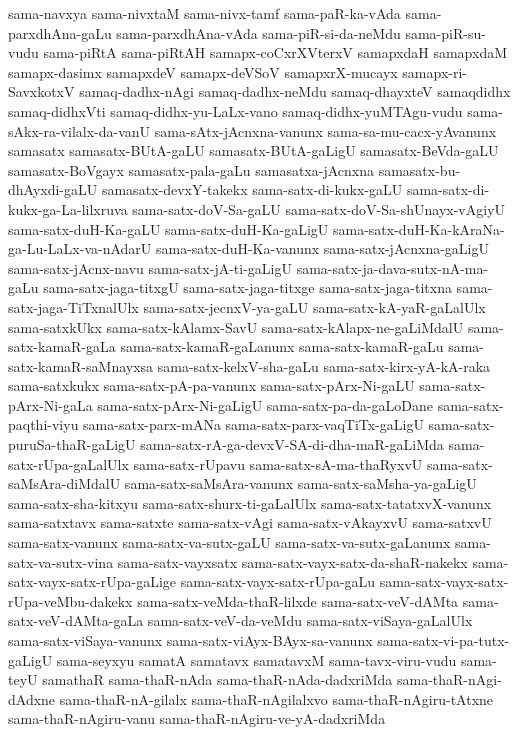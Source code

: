 {sama-navxya
sama-nivxtaM
sama-nivx-tamf
sama-paR-ka-vAda
sama-parxdhAna-gaLu
sama-parxdhAna-vAda
sama-piR-si-da-neMdu
sama-piR-su-vudu
sama-piRtA
sama-piRtAH
samapx-coCxrXVterxV
samapxdaH
samapxdaM
samapx-dasimx
samapxdeV
samapx-deVSoV
samapxrX-mucayx
samapx-ri-SavxkotxV
samaq-dadhx-nAgi
samaq-dadhx-neMdu
samaq-dhayxteV
samaqdidhx
samaq-didhxVti
samaq-didhx-yu-LaLx-vano
samaq-didhx-yuMTAgu-vudu
sama-sAkx-ra-vilalx-da-vanU
sama-sAtx-jAcnxna-vanunx
sama-sa-mu-cacx-yAvanunx
samasatx
samasatx-BUtA-gaLU
samasatx-BUtA-gaLigU
samasatx-BeVda-gaLU
samasatx-BoVgayx
samasatx-pala-gaLu
samasatxa-jAcnxna
samasatx-bu-dhAyxdi-gaLU
samasatx-devxY-takekx
sama-satx-di-kukx-gaLU
sama-satx-di-kukx-ga-La-lilxruva
sama-satx-doV-Sa-gaLU
sama-satx-doV-Sa-shUnayx-vAgiyU
sama-satx-duH-Ka-gaLU
sama-satx-duH-Ka-gaLigU
sama-satx-duH-Ka-kAraNa-ga-Lu-LaLx-va-nAdarU
sama-satx-duH-Ka-vanunx
sama-satx-jAcnxna-gaLigU
sama-satx-jAcnx-navu
sama-satx-jA-ti-gaLigU
sama-satx-ja-dava-sutx-nA-ma-gaLu
sama-satx-jaga-titxgU
sama-satx-jaga-titxge
sama-satx-jaga-titxna
sama-satx-jaga-TiTxnalUlx
sama-satx-jecnxV-ya-gaLU
sama-satx-kA-yaR-gaLalUlx
sama-satxkUkx
sama-satx-kAlamx-SavU
sama-satx-kAlapx-ne-gaLiMdalU
sama-satx-kamaR-gaLa
sama-satx-kamaR-gaLanunx
sama-satx-kamaR-gaLu
sama-satx-kamaR-saMnayxsa
sama-satx-kelxV-sha-gaLu
sama-satx-kirx-yA-kA-raka
sama-satxkukx
sama-satx-pA-pa-vanunx
sama-satx-pArx-Ni-gaLU
sama-satx-pArx-Ni-gaLa
sama-satx-pArx-Ni-gaLigU
sama-satx-pa-da-gaLoDane
sama-satx-paqthi-viyu
sama-satx-parx-mANa
sama-satx-parx-vaqTiTx-gaLigU
sama-satx-puruSa-thaR-gaLigU
sama-satx-rA-ga-devxV-SA-di-dha-maR-gaLiMda
sama-satx-rUpa-gaLalUlx
sama-satx-rUpavu
sama-satx-sA-ma-thaRyxvU
sama-satx-saMsAra-diMdalU
sama-satx-saMsAra-vanunx
sama-satx-saMsha-ya-gaLigU
sama-satx-sha-kitxyu
sama-satx-shurx-ti-gaLalUlx
sama-satx-tatatxvX-vanunx
sama-satxtavx
sama-satxte
sama-satx-vAgi
sama-satx-vAkayxvU
sama-satxvU
sama-satx-vanunx
sama-satx-va-sutx-gaLU
sama-satx-va-sutx-gaLanunx
sama-satx-va-sutx-vina
sama-satx-vayxsatx
sama-satx-vayx-satx-da-shaR-nakekx
sama-satx-vayx-satx-rUpa-gaLige
sama-satx-vayx-satx-rUpa-gaLu
sama-satx-vayx-satx-rUpa-veMbu-dakekx
sama-satx-veMda-thaR-lilxde
sama-satx-veV-dAMta
sama-satx-veV-dAMta-gaLa
sama-satx-veV-da-veMdu
sama-satx-viSaya-gaLalUlx
sama-satx-viSaya-vanunx
sama-satx-viAyx-BAyx-sa-vanunx
sama-satx-vi-pa-tutx-gaLigU
sama-seyxyu
samatA
samatavx
samatavxM
sama-tavx-viru-vudu
sama-teyU
samathaR
sama-thaR-nAda
sama-thaR-nAda-dadxriMda
sama-thaR-nAgi-dAdxne
sama-thaR-nA-gilalx
sama-thaR-nAgilalxvo
sama-thaR-nAgiru-tAtxne
sama-thaR-nAgiru-vanu
sama-thaR-nAgiru-ve-yA-dadxriMda
}
